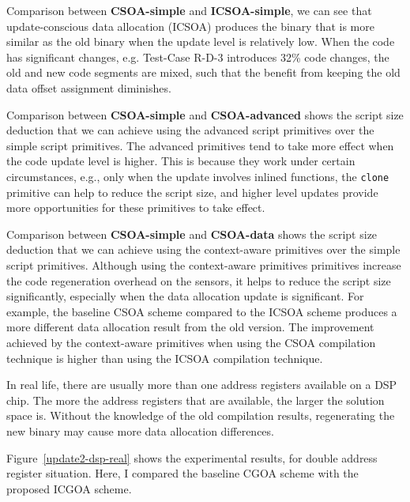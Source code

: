 Comparison between \textbf{CSOA-simple} and \textbf{ICSOA-simple}, we can see that update-conscious data allocation (ICSOA) produces the binary that is more similar as the old binary when the update level is relatively low. When the code has significant changes, e.g. Test-Case R-D-3 introduces 32\% code changes, the old and new code segments are mixed, such that the benefit from keeping the old data offset assignment diminishes.

Comparison between \textbf{CSOA-simple} and \textbf{CSOA-advanced} shows the script size deduction that we can achieve using the advanced script primitives over the simple script primitives. The advanced primitives tend to take more effect when the code update level is higher. This is because they work under certain circumstances, e.g., only when the update involves inlined functions, the {\tt clone} primitive can help to reduce the script size, and higher level updates provide more opportunities for these primitives to take effect.

Comparison between \textbf{CSOA-simple} and \textbf{CSOA-data} shows the script size deduction that we can achieve using the   context-aware primitives over the simple script primitives. Although using the  context-aware primitives primitives increase the code regeneration overhead on the sensors, it helps to reduce the script size significantly, especially when the data allocation update is significant. For example, the baseline CSOA scheme compared to the ICSOA scheme produces a more different data allocation result from the old version.
The improvement achieved by the  context-aware primitives when using the CSOA compilation technique is higher than using the ICSOA compilation technique.

In real life, there are usually more than one address registers available on a DSP chip. The more the address registers that are available, the larger the solution space is. Without the knowledge of the old compilation results, regenerating the new binary may cause more data allocation differences. 

Figure~\ref{update2-dsp-real} shows the experimental results, for double address register situation.
Here, I compared the baseline CGOA scheme with the proposed ICGOA scheme. 

